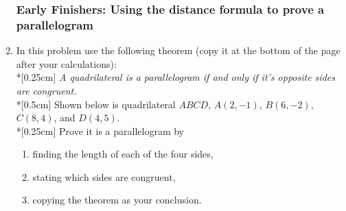 \documentclass[12pt, twoside]{article}
\begin{document}
\begin{enumerate}
\newpage
\subsubsection*{Early Finishers: Using the distance formula to prove a parallelogram}
  \item In this problem use the following theorem (copy it at the bottom of the page after your calculations): \\*[0.25cm]
  \emph{A quadrilateral is a parallelogram if and only if it's opposite sides are congruent.}\\*[0.5cm]
  Shown below is quadrilateral $ABCD$, $A(2,-1)$, $B(6,-2)$, $C(8,4)$, and $D(4,5)$. \\*[0.25cm]
  Prove it is a parallelogram by
  \begin{enumerate}
    \item finding the length of each of the four sides,
    \item stating which sides are congruent,
    \item copying the theorem as your conclusion.
  \end{enumerate}
  \begin{flushright} %
  \end{flushright}


\end{enumerate}
\end{document}
